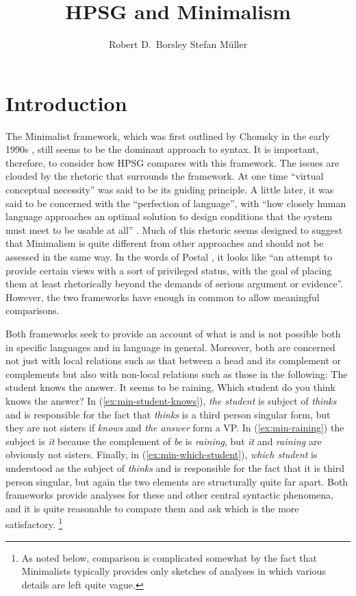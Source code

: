 \documentclass[output=paper]{langsci/langscibook}
\author{%
	Robert D.\ Borsley\affiliation{University of Essex}%
	\lastand Stefan Müller\affiliation{Humboldt-Universität zu Berlin}%
}
\title{HPSG and Minimalism}
\begin{document}
\label{chap-minimalism}

\section{Introduction}
\label{sec:min-intro}

The Minimalist framework, which was first outlined by Chomsky in the early 1990s
\citep{Chomsky93b-u,Chomsky95a-u}, still seems to be the dominant approach to syntax. It is
important, therefore, to consider how HPSG compares with this framework. The issues are clouded by
the rhetoric that surrounds the framework. At one time ``virtual conceptual necessity'' was said to be
its guiding principle. A little later, it was said to be concerned with the ``perfection of
language'', with ``how closely human language approaches an optimal solution to design conditions
that the system must meet to be usable at all'' \citet[58]{Chomsky2002a-u}. Much of this rhetoric
seems designed to suggest that Minimalism is quite different from other approaches and should not be
assessed in the same way. In the words of Postal \citet[19]{Postal2003a}, it looks like ``an attempt
to provide certain views with a sort of privileged status, with the goal of placing them at least
rhetorically beyond the demands of serious argument or evidence''. However, the two frameworks have
enough in common to allow meaningful comparisons.


Both frameworks seek to provide an account of what is and is not possible both in specific languages and in language in general. Moreover, both are concerned not just with local relations such as that between a head and its complement or complements but also with non-local relations such as those in the following:
\ea\label{ex:min-student-knows}
The student knows the answer.
\z
\ea\label{ex:min-raining}
It seems to be raining,
\z
\ea\label{ex:min-which-student}
Which student do you think knows the answer? 
\z
In (\ref{ex:min-student-knows}), \textit{the student} is subject of \textit{thinks} and is
responsible for the fact that \textit{thinks} is a third person singular form, but they are not
sisters if \textit{knows} and \textit{the answer} form a VP. In (\ref{ex:min-raining}) the subject
is \emph{it} because the complement of \textit{be} is \textit{raining}, but \emph{it} and \emph{raining} are
obviously not sisters. Finally, in (\ref{ex:min-which-student}), \textit{which student} is
understood as the subject of \textit{thinks} and is responsible for the fact that it is third person
singular, but again the two elements are structurally quite far apart. Both frameworks provide
analyses for these and other central syntactic phenomena, and it is quite reasonable to compare them
and ask which is the more satisfactory.%
	\footnote{As noted below, comparison is complicated somewhat by the fact that Minimalists typically provides only sketches of analyses in which various details are left quite vague.}%
\end{document}
